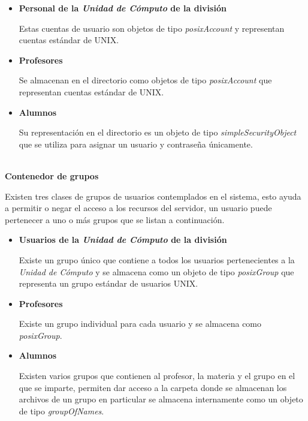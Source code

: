 \begin{itemize}

  \item \textbf{Personal de la \textit{Unidad de C\'{o}mputo} de la divisi\'{o}n}

  Estas cuentas de usuario son objetos de tipo \textit{posixAccount} y representan cuentas est\'{a}ndar de \textsc{UNIX}.

  \item \textbf{Profesores}

  Se almacenan en el directorio como objetos de tipo \textit{posixAccount} que representan cuentas est\'{a}ndar de \textsc{UNIX}.

  \item \textbf{Alumnos}

  Su representaci\'{o}n en el directorio es un objeto de tipo \textit{simpleSecurityObject} que se utiliza para asignar un usuario y contrase\~{n}a \'{u}nicamente.

\end{itemize}

\textbf{\\ Contenedor de grupos \\}

Existen tres clases de grupos de usuarios contemplados en el sistema, esto ayuda a permitir o negar el acceso a los recursos del servidor, un usuario puede pertenecer a uno o m\'{a}s grupos que se listan a continuaci\'{o}n.

\begin{itemize}

  \item \textbf{Usuarios de la \textsl{Unidad de C\'{o}mputo} de la divisi\'{o}n}

  Existe un grupo \'{u}nico que contiene a todos los usuarios pertenecientes a la \textit{Unidad de C\'{o}mputo} y se almacena como un objeto de tipo \textit{posixGroup} que representa un grupo est\'{a}ndar de usuarios \textsc{UNIX}.

  \item \textbf{Profesores}

  Existe un grupo individual para cada usuario y se almacena como \textit{posixGroup}.

  \item \textbf{Alumnos}

  Existen varios grupos que contienen al profesor, la materia y el grupo en el que se imparte, permiten dar acceso a la carpeta donde se almacenan los archivos de un grupo en particular se almacena internamente como un objeto de tipo \textit{groupOfNames}.

\end{itemize}

